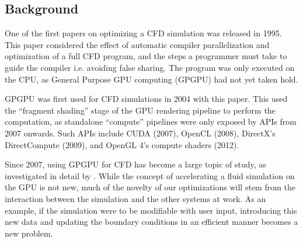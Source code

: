 \subsection{Background}
One of the first papers on optimizing a CFD simulation was released in 1995\cite{paper:1995CfdOpt:1383209}.
This paper considered the effect of automatic compiler parallelization and optimization of a full CFD program, and the steps a programmer must take to guide the compiler i.e. avoiding false sharing.
The program was only executed on the CPU, as General Purpose GPU computing (GPGPU) had not yet taken hold.

GPGPU was first used for CFD simulations in 2004 with this paper\cite{paper:2004CfdGPU:10.1109/SC.2004.26}.
This used the ``fragment shading'' stage of the GPU rendering pipeline to perform the computation, as standalone ``compute'' pipelines were only exposed by APIs from 2007 onwards.
Such APIs include CUDA (2007)\cite{tool:CUDAProgrammingV1}, OpenCL (2008)\cite{tool:OpenCL1.0PressRelease}, DirectX's DirectCompute (2009)\cite{tool:DirectComputePresentation}, and OpenGL 4's compute shaders (2012)\cite{tool:OpenGLComputeShaderExt}.

Since 2007, using GPGPU for CFD has become a large topic of study, as investigated in detail by \cite{paper:GPGPUSummary:10.1007/s11227-013-1015-7}.
While the concept of accelerating a fluid simulation on the GPU is not new, much of the novelty of our optimizations will stem from the interaction between the simulation and the other systems at work.
As an example, if the simulation were to be modifiable with user input, introducing this new data and updating the boundary conditions in an efficient manner becomes a new problem.